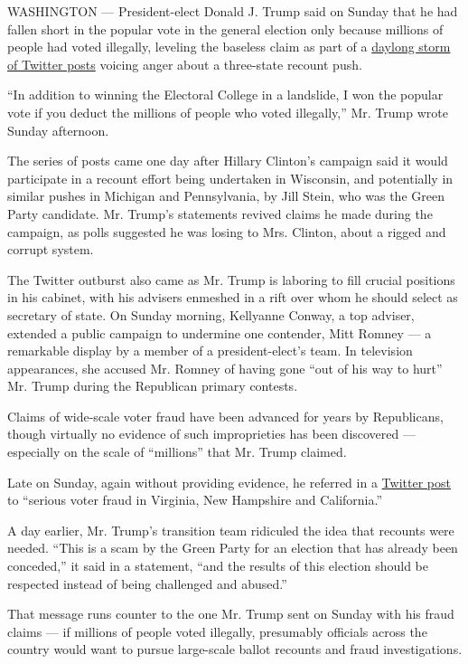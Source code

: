 WASHINGTON --- President-elect Donald J. Trump said on Sunday that he
had fallen short in the popular vote in the general election only
because millions of people had voted illegally, leveling the baseless
claim as part of a \href{https://twitter.com/realDonaldTrump}{daylong
storm of Twitter posts} voicing anger about a three-state recount push.

``In addition to winning the Electoral College in a landslide, I won the
popular vote if you deduct the millions of people who voted illegally,''
Mr. Trump wrote Sunday afternoon.

The series of posts came one day after Hillary Clinton's campaign said
it would participate in a recount effort being undertaken in Wisconsin,
and potentially in similar pushes in Michigan and Pennsylvania, by Jill
Stein, who was the Green Party candidate. Mr. Trump's statements revived
claims he made during the campaign, as polls suggested he was losing to
Mrs. Clinton, about a rigged and corrupt system.

The Twitter outburst also came as Mr. Trump is laboring to fill crucial
positions in his cabinet, with his advisers enmeshed in a rift over whom
he should select as secretary of state. On Sunday morning, Kellyanne
Conway, a top adviser, extended a public campaign to undermine one
contender, Mitt Romney --- a remarkable display by a member of a
president-elect's team. In television appearances, she accused Mr.
Romney of having gone ``out of his way to hurt'' Mr. Trump during the
Republican primary contests.

Claims of wide-scale voter fraud have been advanced for years by
Republicans, though virtually no evidence of such improprieties has been
discovered --- especially on the scale of ``millions'' that Mr. Trump
claimed.

Late on Sunday, again without providing evidence, he referred in a
\href{https://twitter.com/realDonaldTrump/status/803033642545115140}{Twitter
post} to ``serious voter fraud in Virginia, New Hampshire and
California.''

A day earlier, Mr. Trump's transition team ridiculed the idea that
recounts were needed. ``This is a scam by the Green Party for an
election that has already been conceded,'' it said in a statement, ``and
the results of this election should be respected instead of being
challenged and abused.''

That message runs counter to the one Mr. Trump sent on Sunday with his
fraud claims --- if millions of people voted illegally, presumably
officials across the country would want to pursue large-scale ballot
recounts and fraud investigations.

